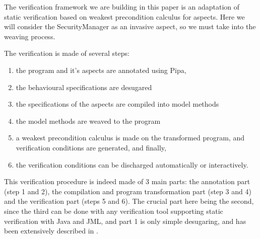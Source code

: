 The verification framework we are building in this paper 
is an adaptation of static 
verification based on weakest precondition calculus for aspects. 
Here we will consider 
the SecurityManager as an invasive aspect, 
so we must take into the weaving process. 

The verification is made of several steps:
\begin{enumerate}
\item the program and it's aspects are annotated using Pipa,
\item the behavioural specifications are desugared
\item the specifications of the aspects are compiled into model methods
\item the model methods are weaved to the program
\item a weakest precondition calculus is made on the transformed program, and verification
conditions are generated, and finally,
\item the verification conditions can be discharged automatically or interactively.
\end{enumerate}
This verification procedure is indeed made of 3 main parts: the annotation
part (step 1 and 2), the compilation and program transformation part (step 3 and 4)
and the verification part (steps 5 and 6).
The crucial part here being the second, since the third can be done with any verification tool
supporting static verification with Java and JML, and part 1 is only simple desugaring, and has been
extensively described in \cite{RaghavanL00}.